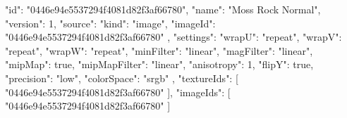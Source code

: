 {
  "id": "0446e94e5537294f4081d82f3af66780",
  "name": "Moss Rock Normal",
  "version": 1,
  "source": {
    "kind": "image",
    "imageId": "0446e94e5537294f4081d82f3af66780"
  },
  "settings": {
    "wrapU": "repeat",
    "wrapV": "repeat",
    "wrapW": "repeat",
    "minFilter": "linear",
    "magFilter": "linear",
    "mipMap": true,
    "mipMapFilter": "linear",
    "anisotropy": 1,
    "flipY": true,
    "precision": "low",
    "colorSpace": "srgb"
  },
  "textureIds": [
    "0446e94e5537294f4081d82f3af66780"
  ],
  "imageIds": [
    "0446e94e5537294f4081d82f3af66780"
  ]
}
